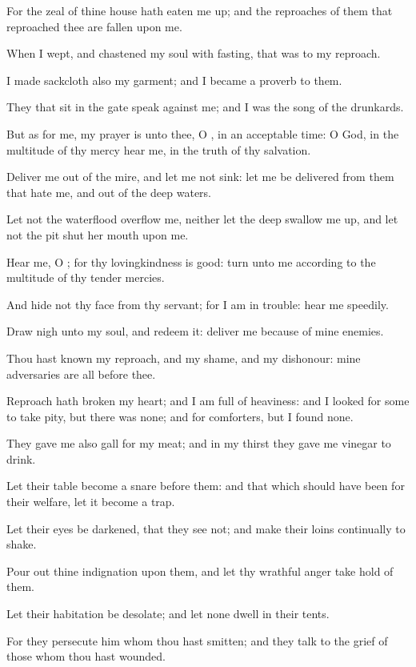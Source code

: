 \verse For the zeal of thine house hath eaten me up; and the reproaches of them that reproached thee are fallen upon me.

\verse When I wept, and chastened my soul with fasting, that was to my reproach.

\verse I made sackcloth also my garment; and I became a proverb to them.

\verse They that sit in the gate speak against me; and I was the song of the drunkards.

\verse But as for me, my prayer is unto thee, O \LORD, in an acceptable time: O God, in the multitude of thy mercy hear me, in the truth of thy salvation.

\verse Deliver me out of the mire, and let me not sink: let me be delivered from them that hate me, and out of the deep waters.

\verse Let not the waterflood overflow me, neither let the deep swallow me up, and let not the pit shut her mouth upon me.

\verse Hear me, O \LORD; for thy lovingkindness is good: turn unto me according to the multitude of thy tender mercies.

\verse And hide not thy face from thy servant; for I am in trouble: hear me speedily.

\verse Draw nigh unto my soul, and redeem it: deliver me because of mine enemies.

\verse Thou hast known my reproach, and my shame, and my dishonour: mine adversaries are all before thee.

\verse Reproach hath broken my heart; and I am full of heaviness: and I looked for some to take pity, but there was none; and for comforters, but I found none.

\verse They gave me also gall for my meat; and in my thirst they gave me vinegar to drink.

\verse Let their table become a snare before them: and that which should have been for their welfare, let it become a trap.

\verse Let their eyes be darkened, that they see not; and make their loins continually to shake.

\verse Pour out thine indignation upon them, and let thy wrathful anger take hold of them.

\verse Let their habitation be desolate; and let none dwell in their tents.

\verse For they persecute him whom thou hast smitten; and they talk to the grief of those whom thou hast wounded.

